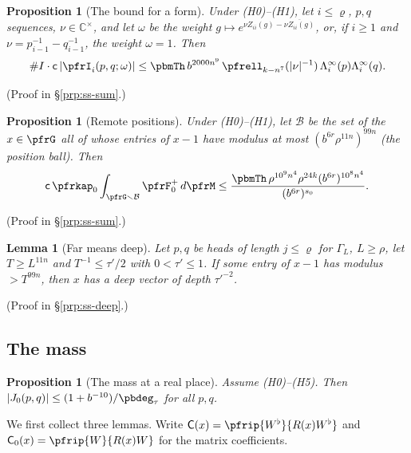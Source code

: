 \documentclass[10pt]{amsart}
\newtheorem{proposition}[theorem]{Proposition}
\newtheorem{lemma}[theorem]{Lemma}
\theoremstyle{definition}
\theoremstyle{remark}
\newcommand{\C}{\mathbb C}
\begin{document}
\begin{proposition}[The bound for a form]\label{pfr:formbound}
Under \textup{(H0)}--\textup{(H1)}, let $i\le\varrho$, $p,q$ sequences, $\nu\in\C^\times$, and let
$\omega$ be the weight $g\mapsto e^{\nu Z_{ii}(g)-\overline{\nu Z_{ii}(g)}}$, or, if $i\ge1$ and
$\nu=p_{i-1}^{-1}-q_{i-1}^{-1}$, the weight $\omega=1$. Then
\[
\#I\cdot\mathsf c\,|\pfrI_i(p,q;\omega)|\le\pbmTh\,b^{2000n^9}\,\pfrell_{k-n^7}(|\nu|^{-1})\,
\Lambda^\infty_i(p)\Lambda^\infty_i(q).
\]
\end{proposition}
(Proof in \S\ref{prp:ss-sum}.)

\begin{proposition}[Remote positions]\label{pfr:remote}
Under \textup{(H0)}--\textup{(H1)}, let $\mathcal B$ be the set of the $x\in\pfrG$ all of whose entries
of $x-1$ have modulus at most $(b^{6r}\rho^{11n})^{99n}$ (the \emph{position ball}). Then
\[
\mathsf c\,\pfrkap_0\int_{\pfrG\smallsetminus\mathcal B}\pfrF^+_0\,d\pfrM\le\frac{\pbmTh\,\rho^{10^9n^4}\rho^{24k}
(b^{6r})^{10^8n^4}}{(b^{6r})^{s_0}}.
\]
\end{proposition}
(Proof in \S\ref{prp:ss-sum}.)

\begin{lemma}[Far means deep]\label{pfr:deepreal}
Let $p,q$ be heads of length $j\le\varrho$ for $\Gamma_L$, $L\ge\rho$, let $T\ge L^{11n}$ and
$T^{-1}\le\tau'/2$ with $0<\tau'\le1$. If some entry of $x-1$ has modulus $>T^{99n}$, then $x$ has a deep
vector of depth $\tau'^{-2}$.
\end{lemma}
(Proof in \S\ref{prp:ss-deep}.)

\subsection{The mass}\label{pfr:ss-mass}

\begin{proposition}[The mass at a real place]\label{pfr:mass}
Assume \textup{(H0)}--\textup{(H5)}. Then $|J_0(p,q)|\le(1+b^{-10})/\pbdeg_\tau$ for all $p,q$.
\end{proposition}

We first collect three lemmas. Write $\mathsf C(x)=\pfrip{W^\flat}{R(x)W^\flat}$ and
$\mathsf C_0(x)=\pfrip{W}{R(x)W}$ for the matrix coefficients.
\end{document}
